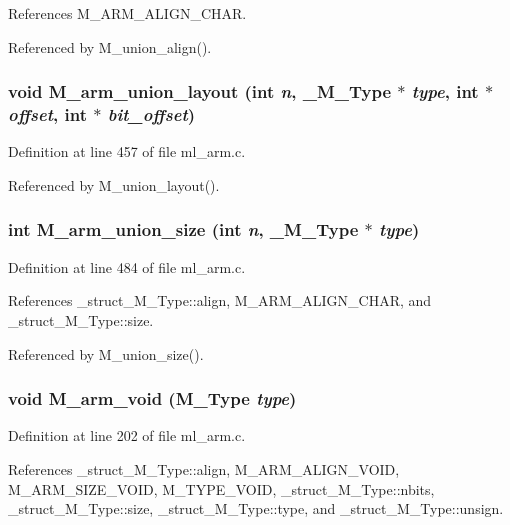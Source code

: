 References M\_\-ARM\_\-ALIGN\_\-CHAR.

Referenced by M\_\-union\_\-align().
\subsubsection{\setlength{\rightskip}{0pt plus 5cm}void M\_\-arm\_\-union\_\-layout (int {\em n}, \bf{\_\-M\_\-Type} $\ast$ {\em type}, int $\ast$ {\em offset}, int $\ast$ {\em bit\_\-offset})}\label{ml__arm_8c_e1c7e436386eba93c9d41d69562e1828}




Definition at line 457 of file ml\_\-arm.c.

Referenced by M\_\-union\_\-layout().
\subsubsection{\setlength{\rightskip}{0pt plus 5cm}int M\_\-arm\_\-union\_\-size (int {\em n}, \bf{\_\-M\_\-Type} $\ast$ {\em type})}\label{ml__arm_8c_428f2f5865a805d129bc91c6c5d1ad27}




Definition at line 484 of file ml\_\-arm.c.

References \_\-struct\_\-M\_\-Type::align, M\_\-ARM\_\-ALIGN\_\-CHAR, and \_\-struct\_\-M\_\-Type::size.

Referenced by M\_\-union\_\-size().
\subsubsection{\setlength{\rightskip}{0pt plus 5cm}void M\_\-arm\_\-void (\bf{M\_\-Type} {\em type})}\label{ml__arm_8c_0a6e8bf43f36e7f55266ccfd35f44129}




Definition at line 202 of file ml\_\-arm.c.

References \_\-struct\_\-M\_\-Type::align, M\_\-ARM\_\-ALIGN\_\-VOID, M\_\-ARM\_\-SIZE\_\-VOID, M\_\-TYPE\_\-VOID, \_\-struct\_\-M\_\-Type::nbits, \_\-struct\_\-M\_\-Type::size, \_\-struct\_\-M\_\-Type::type, and \_\-struct\_\-M\_\-Type::unsign.

